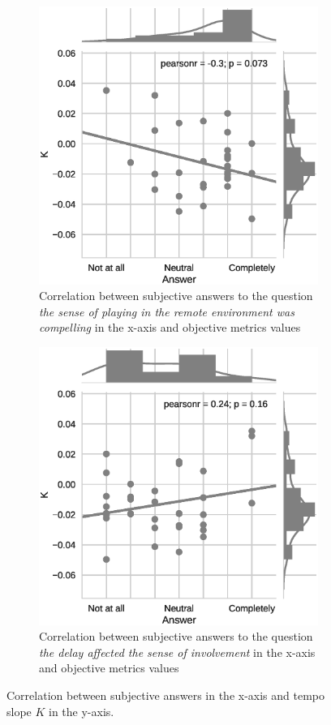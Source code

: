 \documentclass[conference]{IEEEtran}
\begin{document}
\begin{figure}[t]
	\centering
	\begin{subfigure}[t]{.49\textwidth}
		\centering        
		\includegraphics[trim={0cm 0cm 1cm 0cm},clip,width=.8\textwidth]{img/compelling}
		\caption{Correlation between subjective answers to the question \textit{the sense of playing in the remote environment was compelling} in the x-axis and objective metrics values}
		\label{subfig:compelling}
	\end{subfigure}
	\quad
	\begin{subfigure}[t]{.43\textwidth}
		\centering        
		\includegraphics[trim={3cm 0cm 0cm 0cm},clip,width=.8\textwidth]{img/involvement}
		\caption{Correlation between subjective answers to the question \textit{the delay affected the sense of involvement} in the x-axis and objective metrics values}
		\label{subfig:involvement}
	\end{subfigure}
	\quad 
	\caption{Correlation between subjective answers in the x-axis and tempo slope $K$ in the y-axis.}\label{fig:ci}
\end{figure}  
\end{document}
